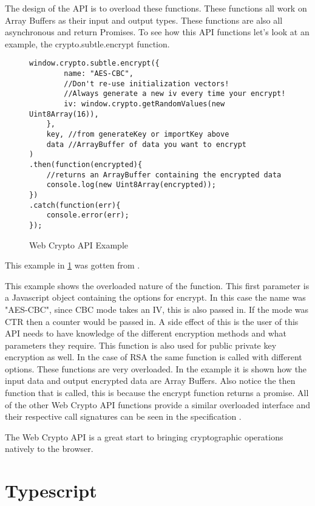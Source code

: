 The design of the API is to overload these functions. These functions all work on Array Buffers as their input and output types. These functions are also all asynchronous and return Promises. To see how this API functions let's look at an example, the crypto.subtle.encrypt function.


\begin{figure}[!htbp]
\centering
\begin{lstlisting}[basicstyle=\small]
window.crypto.subtle.encrypt({
        name: "AES-CBC",
        //Don't re-use initialization vectors!
        //Always generate a new iv every time your encrypt!
        iv: window.crypto.getRandomValues(new Uint8Array(16)),
    },
    key, //from generateKey or importKey above
    data //ArrayBuffer of data you want to encrypt
)
.then(function(encrypted){
    //returns an ArrayBuffer containing the encrypted data
    console.log(new Uint8Array(encrypted));
})
.catch(function(err){
    console.error(err);
});
\end{lstlisting}
\caption{Web Crypto API Example}
\label{fig:wcexample}
\end{figure}


This example in \ref{fig:wcexample} was gotten from \cite{aes-example}.


This example shows the overloaded nature of the function. This first parameter is a Javascript object containing the options for encrypt. In this case the name was "AES-CBC", since CBC mode takes an IV, this is also passed in. If the mode was CTR then a counter would be passed in. A side effect of this is the user of this API needs to have knowledge of the different encryption methods and what parameters they require. This function is also used for public private key encryption as well. In the case of RSA the same function is called with different options. These functions are very overloaded. In the example it is shown how the input data and output encrypted data are Array Buffers. Also notice the then function that is called, this is because the encrypt function returns a promise. All of the other Web Crypto API functions provide a similar overloaded interface and their respective call signatures can be seen in the specification \cite{webcrypto-overview}.


The Web Crypto API is a great start to bringing cryptographic operations natively to the browser.


\section{Typescript}


